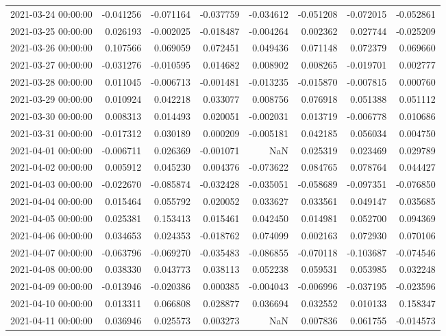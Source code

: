 \begin{tabular}{lrrrrrrr}
2021-03-24 00:00:00 & -0.041256 & -0.071164 & -0.037759 & -0.034612 & -0.051208 & -0.072015 & -0.052861 \\
2021-03-25 00:00:00 & 0.026193 & -0.002025 & -0.018487 & -0.004264 & 0.002362 & 0.027744 & -0.025209 \\
2021-03-26 00:00:00 & 0.107566 & 0.069059 & 0.072451 & 0.049436 & 0.071148 & 0.072379 & 0.069660 \\
2021-03-27 00:00:00 & -0.031276 & -0.010595 & 0.014682 & 0.008902 & 0.008265 & -0.019701 & 0.002777 \\
2021-03-28 00:00:00 & 0.011045 & -0.006713 & -0.001481 & -0.013235 & -0.015870 & -0.007815 & 0.000760 \\
2021-03-29 00:00:00 & 0.010924 & 0.042218 & 0.033077 & 0.008756 & 0.076918 & 0.051388 & 0.051112 \\
2021-03-30 00:00:00 & 0.008313 & 0.014493 & 0.020051 & -0.002031 & 0.013719 & -0.006778 & 0.010686 \\
2021-03-31 00:00:00 & -0.017312 & 0.030189 & 0.000209 & -0.005181 & 0.042185 & 0.056034 & 0.004750 \\
2021-04-01 00:00:00 & -0.006711 & 0.026369 & -0.001071 & NaN & 0.025319 & 0.023469 & 0.029789 \\
2021-04-02 00:00:00 & 0.005912 & 0.045230 & 0.004376 & -0.073622 & 0.084765 & 0.078764 & 0.044427 \\
2021-04-03 00:00:00 & -0.022670 & -0.085874 & -0.032428 & -0.035051 & -0.058689 & -0.097351 & -0.076850 \\
2021-04-04 00:00:00 & 0.015464 & 0.055792 & 0.020052 & 0.033627 & 0.033561 & 0.049147 & 0.035685 \\
2021-04-05 00:00:00 & 0.025381 & 0.153413 & 0.015461 & 0.042450 & 0.014981 & 0.052700 & 0.094369 \\
2021-04-06 00:00:00 & 0.034653 & 0.024353 & -0.018762 & 0.074099 & 0.002163 & 0.072930 & 0.070106 \\
2021-04-07 00:00:00 & -0.063796 & -0.069270 & -0.035483 & -0.086855 & -0.070118 & -0.103687 & -0.074546 \\
2021-04-08 00:00:00 & 0.038330 & 0.043773 & 0.038113 & 0.052238 & 0.059531 & 0.053985 & 0.032248 \\
2021-04-09 00:00:00 & -0.013946 & -0.020386 & 0.000385 & -0.004043 & -0.006996 & -0.037195 & -0.023596 \\
2021-04-10 00:00:00 & 0.013311 & 0.066808 & 0.028877 & 0.036694 & 0.032552 & 0.010133 & 0.158347 \\
2021-04-11 00:00:00 & 0.036946 & 0.025573 & 0.003273 & NaN & 0.007836 & 0.061755 & -0.014573 \\

\end{tabular}
